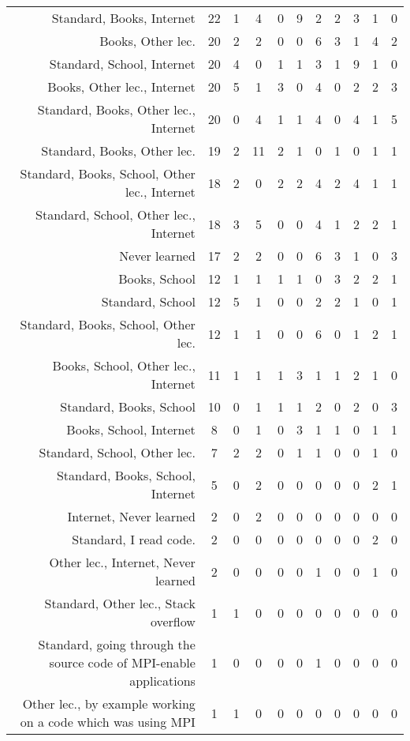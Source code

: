 {\begin{landscape}
\begin{longtable}[htb]{r|c|c|c|c|c|c|c|c|c|c}
{Standard, Books, Internet} & 22 & 1 & 4 & 0 & 9 & 2 & 2 & 3 & 1 & 0 \\%
{Books, Other lec.} & 20 & 2 & 2 & 0 & 0 & 6 & 3 & 1 & 4 & 2 \\%
{Standard, School, Internet} & 20 & 4 & 0 & 1 & 1 & 3 & 1 & 9 & 1 & 0 \\%
{Books, Other lec., Internet} & 20 & 5 & 1 & 3 & 0 & 4 & 0 & 2 & 2 & 3 \\%
{Standard, Books, Other lec., Internet} & 20 & 0 & 4 & 1 & 1 & 4 & 0 & 4 & 1 & 5 \\%
{Standard, Books, Other lec.} & 19 & 2 & 11 & 2 & 1 & 0 & 1 & 0 & 1 & 1 \\%
{Standard, Books, School, Other lec., Internet} & 18 & 2 & 0 & 2 & 2 & 4 & 2 & 4 & 1 & 1 \\%
{Standard, School, Other lec., Internet} & 18 & 3 & 5 & 0 & 0 & 4 & 1 & 2 & 2 & 1 \\%
{Never learned} & 17 & 2 & 2 & 0 & 0 & 6 & 3 & 1 & 0 & 3 \\%
{Books, School} & 12 & 1 & 1 & 1 & 1 & 0 & 3 & 2 & 2 & 1 \\%
{Standard, School} & 12 & 5 & 1 & 0 & 0 & 2 & 2 & 1 & 0 & 1 \\%
{Standard, Books, School, Other lec.} & 12 & 1 & 1 & 0 & 0 & 6 & 0 & 1 & 2 & 1 \\%
{Books, School, Other lec., Internet} & 11 & 1 & 1 & 1 & 3 & 1 & 1 & 2 & 1 & 0 \\%
{Standard, Books, School} & 10 & 0 & 1 & 1 & 1 & 2 & 0 & 2 & 0 & 3 \\%
{Books, School, Internet} & 8 & 0 & 1 & 0 & 3 & 1 & 1 & 0 & 1 & 1 \\%
{Standard, School, Other lec.} & 7 & 2 & 2 & 0 & 1 & 1 & 0 & 0 & 1 & 0 \\%
{Standard, Books, School, Internet} & 5 & 0 & 2 & 0 & 0 & 0 & 0 & 0 & 2 & 1 \\%
{Internet, Never learned} & 2 & 0 & 2 & 0 & 0 & 0 & 0 & 0 & 0 & 0 \\%
{Standard, I read code.} & 2 & 0 & 0 & 0 & 0 & 0 & 0 & 0 & 2 & 0 \\%
{Other lec., Internet, Never learned} & 2 & 0 & 0 & 0 & 0 & 1 & 0 & 0 & 1 & 0 \\%
{Standard, Other lec., Stack overflow} & 1 & 1 & 0 & 0 & 0 & 0 & 0 & 0 & 0 & 0 \\%
{Standard, going through the source code of MPI-enable applications} & 1 & 0 & 0 & 0 & 0 & 1 & 0 & 0 & 0 & 0 \\%
{Other lec., by example working on a code which was using MPI} & 1 & 1 & 0 & 0 & 0 & 0 & 0 & 0 & 0 & 0 \\%

\end{longtable}
\end{landscape}}
